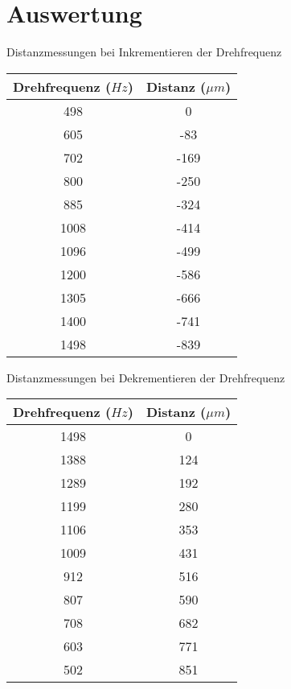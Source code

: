 \section{Auswertung}

\begin{center}
    \begin{threeparttable}
        \caption{Distanzmessungen bei Inkrementieren der Drehfrequenz}
        \begin{tabular}{cc}
            \toprule
            Drehfrequenz ($Hz$) & Distanz ($\mu m$) \\
            \midrule
            498  & 0    \\
            605  & -83  \\
            702  & -169 \\
            800  & -250 \\
            885  & -324 \\
            1008 & -414 \\
            1096 & -499 \\
            1200 & -586 \\
            1305 & -666 \\
            1400 & -741 \\
            1498 & -839 \\
            \bottomrule
        \end{tabular}
    \end{threeparttable}
\end{center}

\begin{center}
    \begin{threeparttable}
        \caption{Distanzmessungen bei Dekrementieren der Drehfrequenz}
        \begin{tabular}{cc}
            \toprule
            Drehfrequenz ($Hz$) & Distanz ($\mu m$) \\
            \midrule
            1498 & 0   \\
            1388 & 124 \\
            1289 & 192 \\
            1199 & 280 \\
            1106 & 353 \\
            1009 & 431 \\
            912  & 516 \\
            807  & 590 \\
            708  & 682 \\
            603  & 771 \\
            502  & 851 \\
            \bottomrule
        \end{tabular}
    \end{threeparttable}
\end{center}

